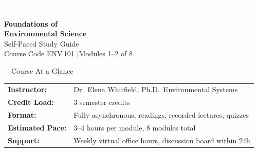 \documentclass[11pt,a4paper]{scrreprt}
\begin{document}
\begin{titlepage}

\vspace*{1.1cm}
\begin{flushleft}
\hspace{1.6cm}\textcolor{white}{\Large\textsc{Meridian Distance Learning Institute}}
\end{flushleft}

\vspace{3.4cm}
\begin{center}
{\Huge\bfseries\color{deepnavy} Foundations of\\[2pt] Environmental Science}\\[10pt]
{\Large\color{tealaccent} Self-Paced Study Guide}\\[4pt]
{\large\color{inkgray} Course Code ENV\,101 \quad$\vert$\quad Modules 1--2 of 8}
\end{center}

\vspace{1.6cm}
\begin{center}
\end{center}

\vspace{1cm}
\begin{center}
\begin{minipage}{0.78\textwidth}
\begin{infobox}{\faGraduationCap\ \ Course At a Glance}
\begin{tabular}{@{}p{3.4cm}p{7.6cm}@{}}
\textbf{Instructor:} & Dr.\ Elena Whitfield, Ph.D.\ Environmental Systems \\
\textbf{Credit Load:} & 3 semester credits \\
\textbf{Format:} & Fully asynchronous; readings, recorded lectures, quizzes \\
\textbf{Estimated Pace:} & 3--4 hours per module, 8 modules total \\
\textbf{Support:} & Weekly virtual office hours, discussion board within 24h \\
\end{tabular}
\end{infobox}
\end{minipage}
\end{center}


\end{titlepage}
\end{document}
